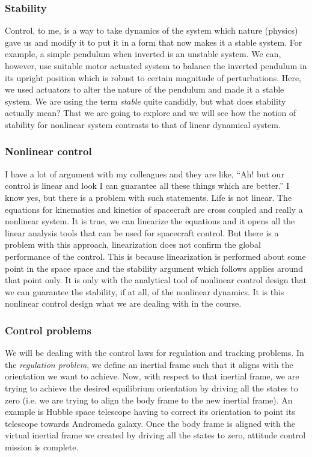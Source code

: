 \documentclass{article}
\begin{document}
\subsubsection*{Stability}
Control, to me, is a way to take dynamics of the system which nature (physics) gave us and modify it to put it in a form that now makes it a stable system. For example, a simple pendulum when inverted is an unstable system. We can, however, use suitable motor actuated system to balance the inverted pendulum in its upright position which is robust to certain magnitude of perturbations. Here, we used actuators to alter the nature of the pendulum and made it a stable system. We are using the term \textit{stable} quite candidly, but what does stability actually mean? That we are going to explore and we will see how the notion of stability for nonlinear system contrasts to that of linear dynamical system.

\subsubsection*{Nonlinear control}
I have a lot of argument with my colleagues and they are like, ``Ah! but our control is linear and look I can guarantee all these things which are better.'' I know yes, but there is a problem with such statements. Life is not linear. The equations for kinematics and kinetics of spacecraft are cross coupled and really a nonlinear system. It is true, we can linearize the equations and it opens all the linear analysis tools that can be used for spacecraft control. But there is a problem with this approach, linearization does not confirm the global performance of the control. This is because linearization is performed about some point in the space space and the stability argument which follows applies around that point only. It is only with the analytical tool of nonlinear control design that we can guarantee the stability, if at all, of the nonlinear dynamics. It is this nonlinear control design what we are dealing with in the course.

\subsubsection*{Control problems}
We will be dealing with the control laws for regulation and tracking problems. 
In the \textit{regulation problem}, we define an inertial frame such that it aligns with the orientation we want to achieve. Now, with respect to that inertial frame, we are trying to achieve the desired equilibrium orientation by driving all the states to zero (i.e. we are trying to align the body frame to the new inertial frame). An example is Hubble space telescope having to correct its orientation to point its telescope towards Andromeda galaxy. Once the body frame is aligned with the virtual inertial frame we created by driving all the states to zero, attitude control mission is complete.
\end{document}
